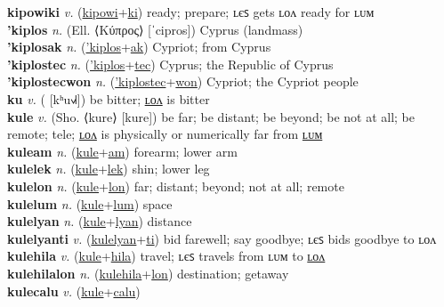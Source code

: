 \textbf{kipowiki} \textit{v.} (\hyperref[kipowi]{kipowi}+\hyperref[ki]{ki})
ready; prepare; ʟєꜱ gets ʟᴏᴧ ready for ʟᴜᴍ \label{kipowiki} \\
\textbf{'kiplos} \textit{n.} (Ell. ⟨Κύπρος⟩ [ˈcipros])
Cyprus (landmass) \label{'kiplos} \\
\textbf{'kiplosak} \textit{n.} (\hyperref['kiplos]{'kiplos}+\hyperref[ak]{ak})
Cypriot; from Cyprus \label{'kiplosak} \\
\textbf{'kiplostec} \textit{n.} (\hyperref['kiplos]{'kiplos}+\hyperref[tec]{tec})
Cyprus; the Republic of Cyprus \label{'kiplostec} \\
\textbf{'kiplostecwon} \textit{n.} (\hyperref['kiplostec]{'kiplostec}+\hyperref[won]{won})
Cypriot; the Cypriot people \label{'kiplostecwon} \\
\textbf{ku} \textit{v.} ( [kʰu˧˩˧])
be bitter; \hyperref[kulon]{ʟᴏᴧ} is bitter \label{ku} \\
\textbf{kule} \textit{v.} (Sho. ⟨kure⟩ [kure])
be far; be distant; be beyond; be not at all; be remote; tele; \hyperref[kulelon]{ʟᴏᴧ} is physically or numerically far from \hyperref[kulelum]{ʟᴜᴍ} \label{kule} \\
\textbf{kuleam} \textit{n.} (\hyperref[kule]{kule}+\hyperref[am]{am})
forearm; lower arm \label{kuleam} \\
\textbf{kulelek} \textit{n.} (\hyperref[kule]{kule}+\hyperref[lek]{lek})
shin; lower leg \label{kulelek} \\
\textbf{kulelon} \textit{n.} (\hyperref[kule]{kule}+\hyperref[lon]{lon})
far; distant; beyond; not at all; remote \label{kulelon} \\
\textbf{kulelum} \textit{n.} (\hyperref[kule]{kule}+\hyperref[lum]{lum})
space \label{kulelum} \\
\textbf{kulelyan} \textit{n.} (\hyperref[kule]{kule}+\hyperref[lyan]{lyan})
distance \label{kulelyan} \\
\textbf{kulelyanti} \textit{v.} (\hyperref[kulelyan]{kulelyan}+\hyperref[ti]{ti})
bid farewell; say goodbye; ʟєꜱ bids goodbye to ʟᴏᴧ \label{kulelyanti} \\
\textbf{kulehila} \textit{v.} (\hyperref[kule]{kule}+\hyperref[hila]{hila})
travel; ʟєꜱ travels from ʟᴜᴍ to \hyperref[kulehilalon]{ʟᴏᴧ} \label{kulehila} \\
\textbf{kulehilalon} \textit{n.} (\hyperref[kulehila]{kulehila}+\hyperref[lon]{lon})
destination; getaway \label{kulehilalon} \\
\textbf{kulecalu} \textit{v.} (\hyperref[kule]{kule}+\hyperref[calu]{calu})
